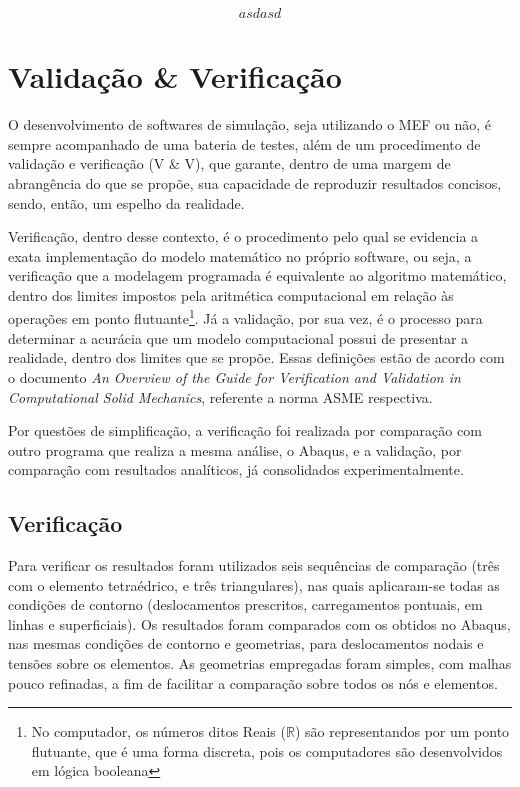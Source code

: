 

$$ asdasd $$
\chapter{Validação \& Verificação}


O desenvolvimento de softwares de simulação, seja utilizando o MEF ou não, é sempre acompanhado de uma bateria de testes, além de um procedimento de validação e verificação (V \& V), que garante, dentro de uma margem de abrangência do que se propõe, sua capacidade de reproduzir resultados concisos, sendo, então, um espelho da realidade.

Verificação, dentro desse contexto, é o procedimento pelo qual se evidencia a exata implementação do modelo matemático no próprio software, ou seja, a verificação que a modelagem programada é equivalente ao algoritmo matemático, dentro dos limites impostos pela aritmética computacional em relação às operações em ponto flutuante\footnote{No computador, os números ditos Reais ($\mathbb{R}$) são representandos por um ponto flutuante, que é uma forma discreta, pois os computadores são desenvolvidos em lógica booleana}. Já a validação, por sua vez, é o processo para determinar a acurácia que um modelo computacional possui de presentar a realidade, dentro dos limites que se propõe. Essas definições estão de acordo com o documento \emph{An Overview of the Guide for Verification and Validation
in Computational Solid Mechanics}, referente a norma ASME respectiva.

Por questões de simplificação, a verificação foi realizada por comparação com outro programa que realiza a mesma análise, o Abaqus, e a validação, por comparação com resultados analíticos, já consolidados experimentalmente.

\section{Verificação}

Para verificar os resultados foram utilizados seis sequências de comparação (três com o elemento tetraédrico, e três triangulares), nas quais aplicaram-se todas as condições de contorno (deslocamentos prescritos, carregamentos pontuais, em linhas e superficiais). Os resultados foram comparados com os obtidos no Abaqus, nas mesmas condições de contorno e geometrias, para deslocamentos nodais e tensões sobre os elementos. As geometrias empregadas foram simples, com malhas pouco refinadas, a fim de facilitar a comparação sobre todos os nós e elementos. 

